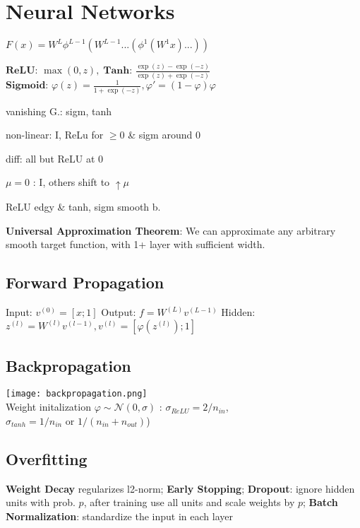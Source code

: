 \section*{Neural Networks}

$F(x)=W^{L}\phi^{L-1}(W^{L-1}...(\phi^{1}(W^{1}x)...))$

$\textbf{ReLU: } \max (0,z), \; \textbf{Tanh: } \frac{\exp(z) - \exp(-z)}{\exp(z) + \exp(-z)}$ \\[-3pt]
$\textbf{Sigmoid: } \varphi(z) = \frac{1}{1 + \exp(-z)}, \varphi' = (1 - \varphi) \varphi$

\begin{rowlist}
    \item vanishing G.: sigm, tanh
    \item non-linear: I, ReLu for $\geq 0$ \& sigm around 0
    \item diff: all but ReLU at 0
    \item $\mu = 0$ : I, others shift to $\uparrow \mu$
    \item ReLU edgy \& tanh, sigm smooth b.

\end{rowlist}


\textbf{Universal Approximation Theorem}: We can approximate any arbitrary smooth target function, with 1+ layer with sufficient width.

\subsection*{Forward Propagation}

Input: $v^{(0)} = [x; 1]$ \quad Output: $f = W^{(L)} v^{(L-1)}$
Hidden: $z^{(l)} = W^{(l)} v^{(l-1)}, v^{(l)} = [\varphi(z^{(l)}); 1]$


\subsection*{Backpropagation}

\texttt{[image: backpropagation.png]} \\[-15pt]

Weight initalization $\varphi \sim \mathcal{N}(0, \sigma)$ : $\sigma_{ReLU}=2 / n_{in}$, $\sigma_{tanh}=  1/n_{in} \text{ or } 1/ (n_{in} + n_{out})$)

\subsection*{Overfitting}
\textbf{Weight Decay} regularizes l2-norm; \textbf{Early Stopping}; \textbf{Dropout}: ignore hidden units with prob. $p$, after training use all units and scale weights by $p$; \textbf{Batch Normalization}: standardize the input in each layer

